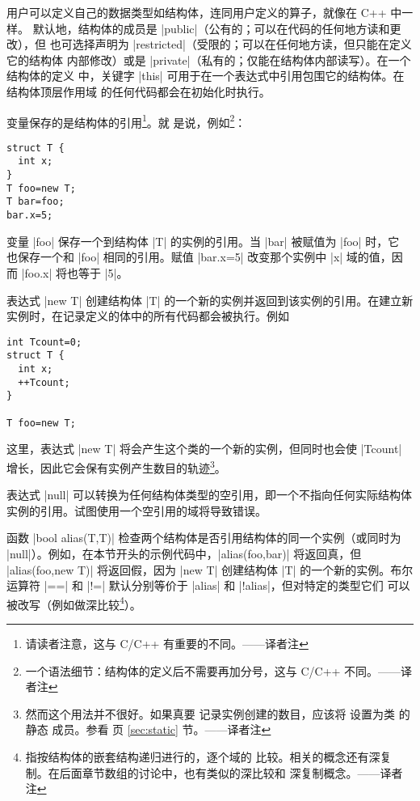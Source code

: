 \documentclass{ctexbook}
\newcommand\transnote[1]{\footnote{#1——译者注}}
\begin{document}
用户可以定义自己的数据类型如结构体，连同用户定义的算子，就像在 C++ 中一样。
默认地，结构体的成员是 |public|（公有的；可以在代码的任何地方读和更改），但
也可选择声明为 |restricted|（受限的；可以在任何地方读，但只能在定义它的结构体
内部修改）或是 |private|（私有的；仅能在结构体内部读写）。在一个结构体的定义
中，关键字 |this| 可用于在一个表达式中引用包围它的结构体。在结构体顶层作用域
的任何代码都会在初始化时执行。

变量保存的是结构体的引用\transnote{请读者注意，这与 C/C++ 有重要的不同。}。就
是说，例如\transnote{一个语法细节：结构体的定义后不需要再加分号，这与 C/C++
不同。}：
\begin{lstlisting}
struct T {
  int x;
}
T foo=new T;
T bar=foo;
bar.x=5;
\end{lstlisting}

变量 |foo| 保存一个到结构体 |T| 的实例的引用。当 |bar| 被赋值为 |foo| 时，它
也保存一个和 |foo| 相同的引用。赋值 |bar.x=5| 改变那个实例中 |x| 域的值，因而
|foo.x| 将也等于 |5|。

表达式 |new T| 创建结构体 |T| 的一个新的实例并返回到该实例的引用。在建立新
实例时，在记录定义的体中的所有代码都会被执行。例如
\begin{lstlisting}
int Tcount=0;
struct T {
  int x;
  ++Tcount;
}

T foo=new T;
\end{lstlisting}

这里，表达式 |new T| 将会产生这个类的一个新的实例，但同时也会使 |Tcount| 
增长，因此它会保有实例产生数目的轨迹\transnote{然而这个用法并不很好。如果真要
记录实例创建的数目，应该将  设置为类 \inlinecode{T} 的静态
成员。参看 \pageref{sec:static} 页 \ref{sec:static} 节。}。

表达式 |null| 可以转换为任何结构体类型的空引用，即一个不指向任何实际结构体
实例的引用。试图使用一个空引用的域将导致错误。

函数 |bool alias(T,T)| 检查两个结构体是否引用结构体的同一个实例（或同时为
|null|）。例如，在本节开头的示例代码中，|alias(foo,bar)| 将返回真，但
|alias(foo,new T)| 将返回假，因为 |new T| 创建结构体 |T| 的一个新的实例。布尔
运算符 |==| 和 |!=| 默认分别等价于 |alias| 和 |!alias|，但对特定的类型它们
可以被改写（例如做深比较\transnote{指按结构体的嵌套结构递归进行的，逐个域的
比较。相关的概念还有深复制。在后面章节数组的讨论中，也有类似的深比较和
深复制概念。}）。
\end{document}
